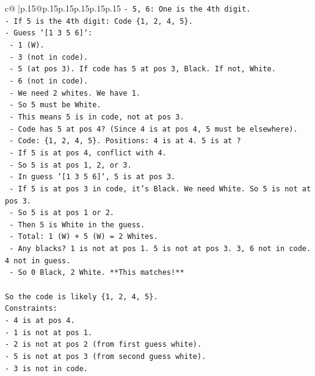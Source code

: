 \documentclass{article}
\begin{document}
{\begin{supertabular}{c@{$\;$}|p{.15\linewidth}@{}p{.15\linewidth}p{.15\linewidth}p{.15\linewidth}p{.15\linewidth}p{.15\linewidth}}
{{{\texttt{{-} 5, 6: One is the 4th digit.} \\
\texttt{{-} If 5 is the 4th digit: Code \{1, 2, 4, 5\}.} \\
\texttt{{-} Guess `{[}1 3 5 6{]}`:} \\
\texttt{  {-} 1 (W).} \\
\texttt{  {-} 3 (not in code).} \\
\texttt{  {-} 5 (at pos 3). If code has 5 at pos 3, Black. If not, White.} \\
\texttt{  {-} 6 (not in code).} \\
\texttt{  {-} We need 2 whites. We have 1.} \\
\texttt{  {-} So 5 must be White.} \\
\texttt{  {-} This means 5 is in code, not at pos 3.} \\
\texttt{  {-} Code has 5 at pos 4? (Since 4 is at pos 4, 5 must be elsewhere).} \\
\texttt{  {-} Code: \{1, 2, 4, 5\}. Positions: 4 is at 4. 5 is at ?} \\
\texttt{  {-} If 5 is at pos 4, conflict with 4.} \\
\texttt{  {-} So 5 is at pos 1, 2, or 3.} \\
\texttt{  {-} In guess `{[}1 3 5 6{]}`, 5 is at pos 3.} \\
\texttt{  {-} If 5 is at pos 3 in code, it's Black. We need White. So 5 is not at pos 3.} \\
\texttt{  {-} So 5 is at pos 1 or 2.} \\
\texttt{  {-} Then 5 is White in the guess.} \\
\texttt{  {-} Total: 1 (W) + 5 (W) = 2 Whites.} \\
\texttt{  {-} Any blacks? 1 is not at pos 1. 5 is not at pos 3. 3, 6 not in code. 4 not in guess.} \\
\texttt{  {-} So 0 Black, 2 White. **This matches!**} \\
\\ 
\texttt{So the code is likely \{1, 2, 4, 5\}.} \\
\texttt{Constraints:} \\
\texttt{{-} 4 is at pos 4.} \\
\texttt{{-} 1 is not at pos 1.} \\
\texttt{{-} 2 is not at pos 2 (from first guess white).} \\
\texttt{{-} 5 is not at pos 3 (from second guess white).} \\
\texttt{{-} 3 is not in code.} \\
}}}
\end{supertabular}}
\end{document}
